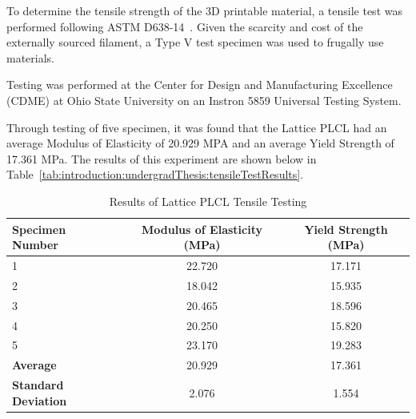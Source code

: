 To determine the tensile strength of the 3D printable material, a tensile test was performed following ASTM D638-14~\cite{RefWorks:RefID:4-test}. Given the scarcity and cost of the externally sourced filament, a Type V test specimen was used to frugally use materials.

Testing was performed at the Center for Design and Manufacturing Excellence (CDME) at Ohio State University on an Instron 5859 Universal Testing System.

Through testing of five specimen, it was found that the Lattice PLCL had an average Modulus of Elasticity of 20.929 MPA and an average Yield Strength of 17.361 MPa. The results of this experiment are shown below in Table~\ref{tab:introduction:undergradThesis:tensileTestResults}.

\begin{table}[H]
        \centering
        \caption{Results of Lattice PLCL Tensile Testing}
        \label{tab:introduction:undergradThesis:tensileTestResults}
        \begin{tabular}{lcc}
                \hline
                \textbf{Specimen Number}    & \textbf{Modulus of Elasticity (MPa)} & \textbf{Yield Strength (MPa)} \\
                \hline
                1                           & 22.720                               & 17.171                        \\
                2                           & 18.042                               & 15.935                        \\
                3                           & 20.465                               & 18.596                        \\
                4                           & 20.250                               & 15.820                        \\
                5                           & 23.170                               & 19.283                        \\
                \hline
                \textbf{Average}            & 20.929                               & 17.361                        \\
                \textbf{Standard Deviation} & 2.076                                & 1.554                         \\
                \hline
        \end{tabular}
        \label{tab:mechanical_properties}
\end{table}
